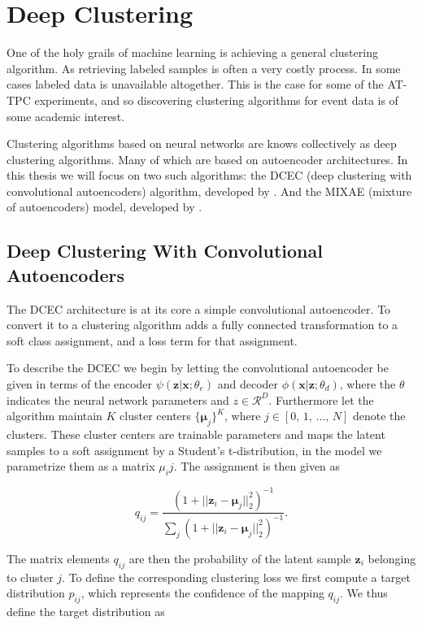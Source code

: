\section{Deep Clustering}\label{sec:deep_clustering}

One of the holy grails of machine learning is achieving a general clustering algorithm. As retrieving labeled samples is often a very costly process. In some cases labeled data is unavailable altogether. This is the case for some of the AT-TPC experiments, and so discovering clustering algorithms for event data is of some academic interest. 

Clustering algorithms based on neural networks are knows collectively as deep clustering algorithms. Many of which are based on autoencoder architectures. In this thesis we will focus on two such algorithms: the DCEC (deep clustering with convolutional autoencoders) algorithm, developed by \citet{Guo2017}. And the MIXAE (mixture of autoencoders) model, developed by \cite{Zhang}. 

\subsection{Deep Clustering With Convolutional Autoencoders}

The DCEC architecture is at its core a simple convolutional autoencoder. To convert it to a clustering algorithm \citet{Guo2017} adds a fully connected transformation to a soft class assignment, and a loss term for that assignment. 

To describe the DCEC we begin by letting the convolutional autoencoder be given in terms of the encoder $\psi(\mathbf{z}|\mathbf{x} ; \theta_e)$ and decoder $\phi(\mathbf{x}|\mathbf{z}; \theta_d)$, where the $\theta$ indicates the neural network parameters and $z \in \mathcal{R}^D$. Furthermore let the algorithm maintain $K$ cluster centers $\{\mathbf{\mu}_j\}^K$, where $j \in [0,\, 1,\, \dots,\, N]$ denote the clusters. These cluster centers are trainable parameters and maps the latent samples to a soft assignment by a Student's t-distribution, in the model we parametrize them as a matrix $\mu_ij$. The assignment is then given as 

\begin{equation}\label{eq:qij}
q_{ij} = \frac{(1 + ||\mathbf{z}_i - \mathbf{\mu}_j||^2_2)^{-1}}{\sum_j(1 + ||\mathbf{z}_i - \mathbf{\mu}_j||^2_2)^{-1}}.
\end{equation}

\noindent The matrix elements $q_{ij}$ are then the probability of the latent sample $\mathbf{z}_i$ belonging to cluster $j$. To define the corresponding clustering loss we first compute a target distribution $p_{ij}$, which represents the confidence of the mapping $q_{ij}$. We thus define the target distribution as 

